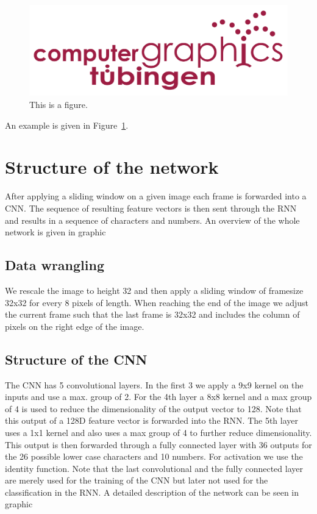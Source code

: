 \documentclass{utue} %
\begin{document}
\begin{figure}[h!]
  \centering
  \includegraphics[width=.9\columnwidth]{images/tuebingen4b_um_rot_small.pdf}
  \caption{\label{fig:figure1}This is a figure.}
\end{figure}
An example is given in Figure~\ref{fig:figure1}.

\section{Structure of the network}
After applying a sliding window on a given image each frame is forwarded into a CNN. The sequence of resulting feature vectors is then sent through the RNN and results in a sequence of characters and numbers. An overview of the whole network is given in graphic %

\subsection{Data wrangling}
We rescale the image to height 32 and then apply a sliding window of framesize 32x32 for every 8 pixels of length. When reaching the end of the image we adjust the current frame such that the last frame is 32x32 and includes the column of pixels on the right edge of the image. 

\subsection{Structure of the CNN}
The CNN has 5 convolutional layers. In the first 3 we apply a 9x9 kernel on the inputs and use a max. group of 2. For the 4th layer a 8x8 kernel and a max group of 4 is used to reduce the dimensionality of the output vector to 128. Note that this output of a 128D feature vector is forwarded into the RNN. The 5th layer uses a 1x1 kernel %
and also uses a max group of 4 to further reduce dimensionality. This output is then forwarded through a fully connected layer with 36 outputs for the 26 possible lower case characters and 10 numbers. For activation we use the identity function. Note that the last convolutional and the fully connected layer are merely used for the training of the CNN but later not used for the classification in the RNN. A detailed description of the network can be seen in graphic %
\end{document}
